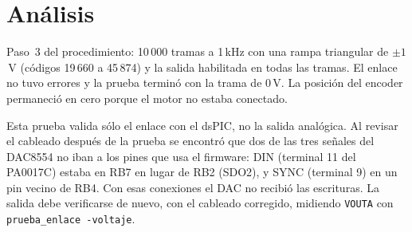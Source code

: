 \section{Análisis}

Paso~3 del procedimiento: 10\,000 tramas a 1\,kHz con una rampa triangular de
$\pm1$\,V (códigos 19\,660 a 45\,874) y la salida habilitada en todas las
tramas. El enlace no tuvo errores y la prueba terminó con la trama de 0\,V.
La posición del encoder permaneció en cero porque el motor no estaba
conectado.

Esta prueba valida sólo el enlace con el dsPIC, no la salida analógica. Al
revisar el cableado después de la prueba se encontró que dos de las tres
señales del DAC8554 no iban a los pines que usa el firmware: DIN (terminal
11 del PA0017C) estaba en RB7 en lugar de RB2 (SDO2), y SYNC (terminal 9)
en un pin vecino de RB4. Con esas conexiones el DAC no recibió las
escrituras. La salida debe verificarse de nuevo, con el cableado corregido,
midiendo \texttt{VOUTA} con \texttt{prueba\_enlace -voltaje}.
